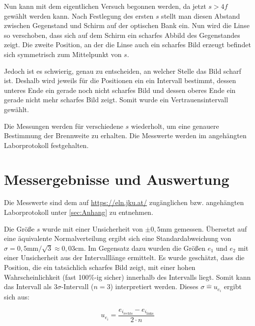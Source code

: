 \documentclass[a4paper,12pt]{article}
\begin{document}
Nun kann mit dem eigentlichen Versuch begonnen werden, da jetzt $s>4f$ gewählt werden kann.
Nach Festlegung des ersten $s$ stellt man diesen Abstand zwischen Gegenstand und Schirm auf der
optischen Bank ein. Nun wird die Linse so verschoben, dass sich auf dem Schirm ein scharfes
Abbild des Gegenstandes zeigt. Die zweite Position, an der die Linse auch ein scharfes Bild erzeugt
befindet sich symmetrisch zum Mittelpunkt von $s$. 

Jedoch ist es schwierig, genau zu entscheiden, an welcher Stelle das Bild scharf ist. Deshalb wird jeweils für 
die Positionen ein ein Intervall bestimmt, dessen unteres Ende ein gerade noch nicht scharfes Bild und dessen oberes
Ende ein gerade nicht mehr scharfes Bild zeigt. Somit wurde ein Vertrauensintervall gewählt.

Die Messungen werden für verschiedene $s$ wiederholt, um eine genauere Bestimmung der Brennweite
zu erhalten. Die Messwerte werden im angehängten Laborprotokoll festgehalten.

\section{Messergebnisse und Auswertung}

Die Messwerte sind dem auf \url{https://eln.jku.at/} zugänglichen bzw. angehängten Laborprotokoll unter \ref{sec:Anhang} zu entnehmen.         %


Die Größe $s$ wurde mit einer Unsicherheit von $\pm 0,5\mathrm{mm}$ gemessen. Übersetzt auf eine äquivalente
Normalverteilung ergibt sich eine Standardabweichung von $\sigma = 0,5\mathrm{mm} / \sqrt{3} \approx 0,03\mathrm{cm}$.
Im Gegensatz dazu wurden die Größen $e_1$ und $e_2$ mit einer Unsicherheit aus der Intervalllänge
ermittelt. Es wurde geschätzt, dass die Position, die ein tatsächlich scharfes Bild zeigt, mit einer
hohen Wahrscheinlichkeit (fast 100\%-ig sicher) innerhalb des Intervalls liegt. Somit kann das 
Intervall als $3\sigma$-Intervall ($n=3$) interpretiert werden. Dieses $\sigma\widehat{=}u_{e_i}$ ergibt sich aus:

\begin{equation}
    \label{eq:BesselAbstandUnsicherheit}
    u_{e_i} = \frac{e_{i_\mathrm{rechts}} - e_{i_\mathrm{links}}}{2\cdot n}
\end{equation}
\end{document}
